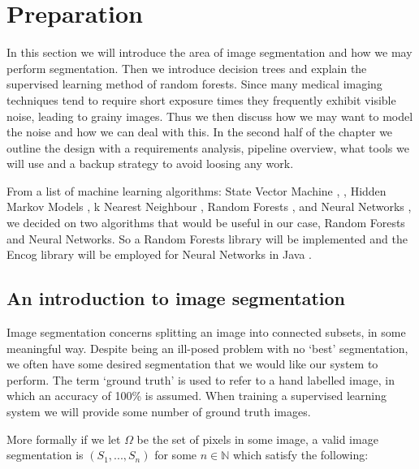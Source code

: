 \documentclass[12pt,twoside,notitlepage]{report}
\newcommand{\bb}[1]{\mathbb{#1}}
\begin{document}

\cleardoublepage
\chapter{Preparation}
    In this section we will introduce the area of image segmentation and how we may perform segmentation. Then we 
    introduce decision trees and explain the supervised learning method of random forests. Since many medical imaging 
    techniques tend to require short exposure times they frequently exhibit visible noise, leading to grainy images. Thus 
    we then discuss how we may want to model the noise and how we can deal with this. In the second half of the chapter 
    we outline the design with a requirements analysis, pipeline overview, what tools we will use and a backup strategy 
    to avoid loosing any work.

    From a list of machine learning algorithms: State Vector Machine \cite{klein2004lagrange}, \cite{law2006simple}, 
    Hidden Markov Models \cite{seymore1999learning}, k Nearest Neighbour \cite{cunningham2007k}, Random Forests 
    \cite{criminisi2013decision}, and Neural Networks \cite{heaton2008introduction}, we decided on two algorithms that 
    would be useful in our case, Random Forests and Neural Networks. So a Random Forests library will be implemented and 
    the Encog library will be employed for Neural Networks in Java \cite{JMLR:v16:heaton15a}.



    \section{An introduction to image segmentation}
        Image segmentation concerns splitting an image into connected subsets, in some meaningful way. Despite being an 
        ill-posed problem with no `best' segmentation, we often have some desired segmentation that we would 
        like our system to perform. The term `ground truth' is used to refer to a hand labelled image, in which an 
        accuracy of 100\% is assumed. When training a supervised learning system we will provide some number of ground 
        truth images. 

        More formally if we let $\Omega$ be the set of pixels in some image, a valid image segmentation is $(S_1, ..., 
        S_n)$ for some $n \in \bb{N}$ which satisfy the following:
\end{document}
